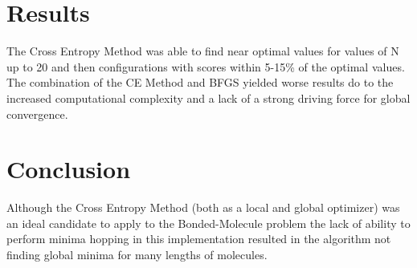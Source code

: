 \documentclass[conference,letterpaper]{IEEEtran}
\begin{document}
\newpage
\section{Results}
The Cross Entropy Method was able to find near optimal values for values of N up to 20 and then configurations with scores within 5-15\% of the optimal values. The combination of the CE Method and BFGS yielded worse results do to the increased computational complexity and a lack of a strong driving force for global convergence.

\section{Conclusion}
Although the Cross Entropy Method (both as a local and global optimizer) was an ideal candidate to apply to the Bonded-Molecule problem the lack of ability to perform minima hopping in this implementation resulted in the algorithm not finding global minima for many lengths of molecules.

\clearpage



\clearpage

%
%
\appendices
\end{document}

